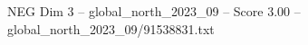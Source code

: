 \begin{textsample}{NEG Dim 3 – global\_north\_2023\_09 – Score 3.00 – global\_north\_2023\_09/91538831.txt}
\end{textsample}

